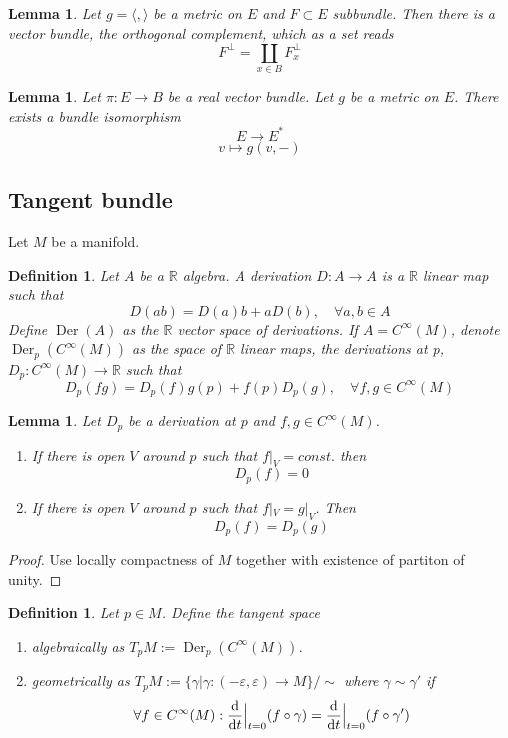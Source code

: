 \documentclass{article}
\numberwithin{theorem}{section}
\newtheorem{lemma}[theorem]{Lemma}
\newtheorem{definition}[theorem]{Definition}
\newcommand{\R}{\mathbb{R}}
\newcommand{\1}{\mathds{1}}
\DeclareMathOperator{\Der}{Der}
\begin{document}
\begin{lemma}
    Let $g = \langle, \rangle$ be a metric on $E$ and $F \subset E$ subbundle. Then there is a vector bundle, the orthogonal complement, which as a set reads 
    \[ F^{\perp } = \coprod_{x \in B} F_x^\perp \]
\end{lemma}

\begin{lemma}

    Let $\pi: E \to B$ be a real vector bundle. Let $g$ be a metric on $E$. There exists a bundle isomorphism 
    \[ E \to E^* \]
    \[ v \mapsto g(v, - ) \]
\end{lemma}
\subsection{Tangent bundle}
Let $M$ be a manifold. 

\begin{definition}
    Let $A$ be a $\R$ algebra. A derivation $D: A \to A  $ is a $\R$ linear map such that 
    \[ D(ab) = D(a)b + aD(b), \quad \forall a,b \in A \]
    Define  $\Der(A) $ as the $\R$ vector space of derivations.  If $A=C^\infty(M)$, denote $\Der_p(C^\infty(M)) $ as the space of $\R$ linear maps, the derivations at p, $D_p : C^\infty(M) \to \R$ such that 
    \[ D_p(fg) = D_p(f) g(p) + f(p)D_p(g), \quad \forall f,g \in C^\infty(M) \]
\end{definition}

\begin{lemma}\label{derivation_locality}
    Let $D_p$ be a derivation at $p$ and $f,g \in C^\infty(M)$.
    \begin{enumerate}
        \item If there is open $V$ around $p$ such that $f|_V = const.$ then 
        \[ D_p(f) = 0\]
        \item  If there is open $V$ around $p$ such that $f|_V = g|_V$. Then 
        \[ D_p(f) = D_p(g) \]
    \end{enumerate}
\end{lemma}
\begin{proof}
    Use locally compactness of $M$ together with existence of partiton of unity. 
\end{proof}

\begin{definition}
    Let $p \in M$. Define the tangent space
    \begin{enumerate}
        \item algebraically as $T_pM:= \Der_p(C^\infty(M))$. 
        \item geometrically as $T_pM:= \{ \gamma | \gamma: (-\varepsilon, \varepsilon) \to M \} / \sim $ where $\gamma \sim \gamma'$ if 
        \[ \forall f \in C^\infty(M) : \dv{}{t}\Big|_{t=0}(f \circ \gamma) = \dv{}{t} \Big|_{t = 0} (f \circ \gamma')\]
    \end{enumerate}
\end{definition}
\end{document}
